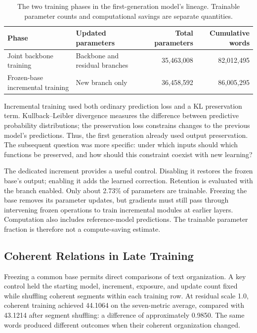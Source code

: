 \begin{table}[htbp]
\caption{The two training phases in the first-generation model's lineage. Trainable parameter counts and computational savings are separate quantities.}
\label{tab:lineage}
\small
\begin{tabularx}{\linewidth}{@{}Y Y r r@{}}
\toprule Phase & Updated parameters & Total parameters & Cumulative words\\\midrule
Joint backbone training & Backbone and residual branches & 35,463,008 & 82,012,495\\
Frozen-base incremental training & New branch only & 36,458,592 & 86,005,295\\
\bottomrule
\end{tabularx}
\end{table}

Incremental training used both ordinary prediction loss and a KL preservation term. Kullback--Leibler divergence measures the difference between predictive probability distributions; the preservation loss constrains changes to the previous model's predictions. Thus, the first generation already used output preservation. The subsequent question was more specific: under which inputs should which functions be preserved, and how should this constraint coexist with new learning?

The dedicated increment provides a useful control. Disabling it restores the frozen base's output; enabling it adds the learned correction. Retention is evaluated with the branch enabled. Only about 2.73\% of parameters are trainable. Freezing the base removes its parameter updates, but gradients must still pass through intervening frozen operations to train incremental modules at earlier layers. Computation also includes reference-model predictions. The trainable parameter fraction is therefore not a compute-saving estimate.

\subsection{Coherent Relations in Late Training}

Freezing a common base permits direct comparisons of text organization. A key control held the starting model, increment, exposure, and update count fixed while shuffling coherent segments within each training row. At residual scale 1.0, coherent training achieved 44.1064 on the seven-metric average, compared with 43.1214 after segment shuffling: a difference of approximately 0.9850. The same words produced different outcomes when their coherent organization changed.

